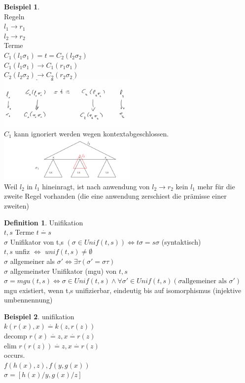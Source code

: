 \documentclass{article}
\theoremstyle{definition}
\newtheorem{beispiel}{Beispiel}[section]
\newtheorem{definition}{Definition}[section]
\begin{document}
	\begin{beispiel}\ \\
	Regeln\\
	$l_1\to r_1$\\
	$l_2\to r_2$\\
	Terme\\
	$C_1(l_1\sigma_1)=t=C_2(l_2\sigma_2)$\\
	$C_1(l_1\sigma_1)\to C_1(r_1\sigma_1)$\\
	$C_2(l_2\sigma_2)\to C_2(r_2\sigma_2)$\\
	\includegraphics[width=256px]{images/lokaleKonfBspNewmann.png}\\
	$C_1$ kann ignoriert werden wegen kontextabgeschlossen.\\
	\includegraphics[width=256px]{images/konfluenzbaum.png}\\
	Weil $l_2$ in $l_1$ hineinragt, ist nach anwendung von $l_2\to r_2$ kein $l_1$ mehr für die zweite Regel vorhanden (die eine anwendung zerschiest die prämisse einer zweiten)\\
	\end{beispiel}
	\begin{definition} Unifikation\\
	$t,s$ Terme $t\stackrel{\cdot}{=} s$\\
	$\sigma$ Unifikator von t,s $(\sigma\in Unif(t,s))\iff t\sigma=s\sigma$ (syntaktisch)\\
	$t,s$ unfiz $\iff$ $unif(t,s)\neq \emptyset$\\
	$\sigma$ allgemeiner als $\sigma' \iff\exists \tau ( \sigma' = \sigma\tau)$\\
	$\sigma$ allgemeinster Unifikator (mgu) von $t,s$
	$\sigma = mgu(t,s)\iff \sigma\in Unif(t,s)\land \forall \sigma'\in Unif(t,s)(\sigma \text{allgemeiner als }\sigma')$ mgu existiert, wenn t,s unifizierbar, eindeutig bis auf isomorphismus (injektive umbennennung)\\
	\end{definition}
	\begin{beispiel} unifikation\\
	$k(r(x),x)\stackrel{\cdot}{=} k(z,r(z))$\\
	decomp $r(x)\stackrel{\cdot}{=}z, x\stackrel{\cdot}{=} r(z)$\\
	elim $r(r(z))\stackrel{\cdot}{=}z, x\stackrel{\cdot}{=} r(z)$\\
	occurs.\\
	$f(h(x),z), f(y,g(x))$\\
	$\sigma=[h(x)/y, g(x)/z]$\\
	\end{beispiel}
\end{document}
